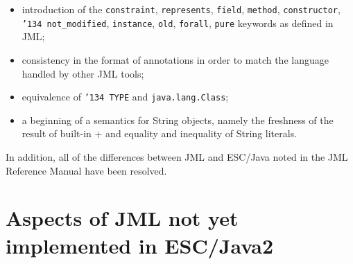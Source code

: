 \documentclass{llncs}
\begin{document}
\begin{itemize}
\item introduction of the \texttt{constraint}, \texttt{represents},
  \texttt{field}, \texttt{method}, \texttt{constructor},
  \texttt{\char'134 not\_modified}, \texttt{instance}, \texttt{old},
  \texttt{forall}, \texttt{pure} keywords as defined in JML;
\item consistency in the format of annotations in order to match the
  language handled by other JML tools;
\item equivalence of \texttt{\char'134 TYPE} and \texttt{java.lang.Class};
\item a beginning of a semantics for String objects, namely the
  freshness of the result of built-in + and equality and inequality of
  String literals.
\end{itemize}
In addition, all of the differences between JML and ESC/Java noted in
the JML Reference Manual have been resolved.

\section{Aspects of JML not yet\\implemented in ESC/Java2}
\end{document}

